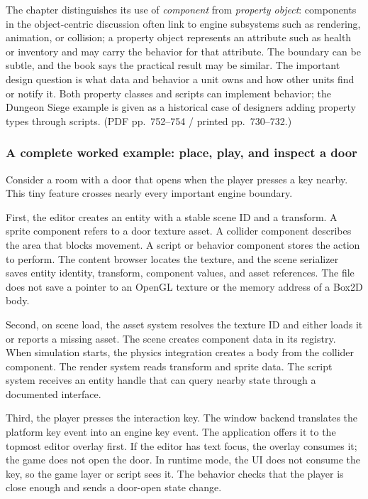 The chapter distinguishes its use of \emph{component} from \emph{property object}: components in the object-centric discussion often link to engine subsystems such as rendering, animation, or collision; a property object represents an attribute such as health or inventory and may carry the behavior for that attribute. The boundary can be subtle, and the book says the practical result may be similar. The important design question is what data and behavior a unit owns and how other units find or notify it. Both property classes and scripts can implement behavior; the Dungeon Siege example is given as a historical case of designers adding property types through scripts. (PDF pp.~752--754 / printed pp.~730--732.)

\subsubsection{A complete worked example: place, play, and inspect a door}\label{a-complete-worked-example-place-play-and-inspect-a-door}

Consider a room with a door that opens when the player presses a key nearby. This tiny feature crosses nearly every important engine boundary.

First, the editor creates an entity with a stable scene ID and a transform. A sprite component refers to a door texture asset. A collider component describes the area that blocks movement. A script or behavior component stores the action to perform. The content browser locates the texture, and the scene serializer saves entity identity, transform, component values, and asset references. The file does not save a pointer to an OpenGL texture or the memory address of a Box2D body.

Second, on scene load, the asset system resolves the texture ID and either loads it or reports a missing asset. The scene creates component data in its registry. When simulation starts, the physics integration creates a body from the collider component. The render system reads transform and sprite data. The script system receives an entity handle that can query nearby state through a documented interface.

Third, the player presses the interaction key. The window backend translates the platform key event into an engine key event. The application offers it to the topmost editor overlay first. If the editor has text focus, the overlay consumes it; the game does not open the door. In runtime mode, the UI does not consume the key, so the game layer or script sees it. The behavior checks that the player is close enough and sends a door-open state change.

